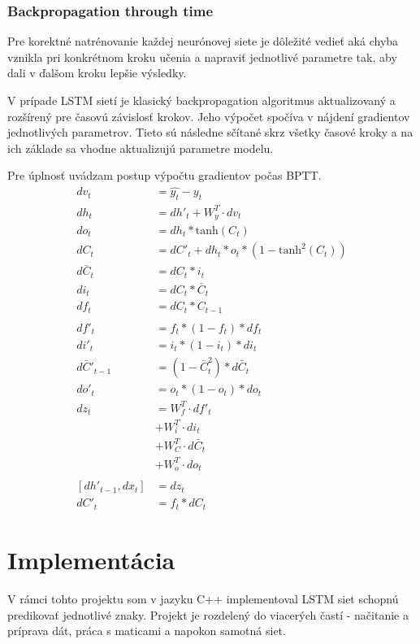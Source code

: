 \documentclass[12pt,a4paper]{article}
\begin{document}
		
		\subsubsection{Backpropagation through time}
			Pre korektné natrénovanie každej neurónovej siete je dôležité vedieť aká chyba vznikla pri konkrétnom kroku učenia a napraviť jednotlivé parametre tak, aby dali v ďalšom kroku lepšie výsledky.
			
			V prípade LSTM sietí je klasický backpropagation algoritmus aktualizovaný a rozšírený pre časovú závislosť krokov. Jeho výpočet spočíva v nájdení gradientov jednotlivých parametrov. Tieto sú následne sčítané skrz všetky časové kroky a na ich základe sa vhodne aktualizujú parametre modelu. \cite{58337}
			
			Pre úplnosť uvádzam postup výpočtu gradientov počas BPTT.
			\begin{align*}
				dv_t &= \hat{y_t} - y_t \\
				dh_t &= dh'_t + W_y^T \cdot dv_t \\
				do_t &= dh_t * \text{tanh}(C_t) \\
				dC_t &= dC'_t + dh_t * o_t * (1 - \text{tanh}^2(C_t))\\
				d\bar{C}_t &= dC_t * i_t \\
				di_t &= dC_t * \bar{C}_t \\
				df_t &= dC_t * C_{t-1} \\
				\\
				df'_t &= f_t * (1 - f_t) * df_t \\
				di'_t &= i_t * (1 - i_t) * di_t \\
				d\bar{C}'_{t-1} &= (1 - \bar{C}_t^2) * d\bar{C}_t \\
				do'_t &= o_t * (1 - o_t) * do_t \\
				dz_t &= W_f^T \cdot df'_t \\
				&+ W_i^T \cdot di_t \\
				&+ W_C^T \cdot d\bar{C}_t \\
				&+ W_o^T \cdot do_t \\
				\\
				[dh'_{t-1}, dx_t] &= dz_t \\
				dC'_t &= f_t * dC_t
			\end{align*}

\newpage		
\section{Implementácia}
	V rámci tohto projektu som v jazyku C++ implementoval LSTM siet schopnú predikovať jednotlivé znaky. Projekt je rozdelený do viacerých častí - načitanie a príprava dát, práca s maticami a napokon samotná siet.
	
\end{document}

